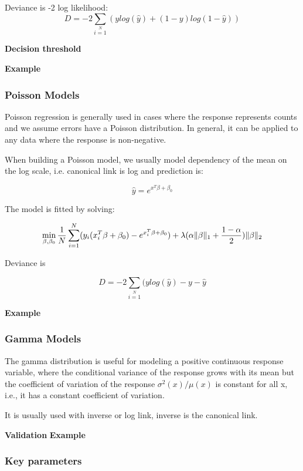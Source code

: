 \documentclass[11pt]{article}
\begin{document}
Deviance is -2 log likelihood:
\[D = -2\sum\limits_{i=1}\limits^{N}{(y log(\hat{y}) + (1 - y)log(1-\hat{y})  )}\]

\textbf{Decision threshold}

\textbf{Example}

\subsubsection{Poisson Models}
Poisson regression is generally used in cases where the response represents counts and we assume errors have a Poisson distribution. In general, it can be applied to any data where the response is non-negative. 

When building a Poisson model, we usually model dependency of the mean on the log scale, i.e. canonical link is log and prediction is:

\[\hat{y} = e^{x^T\beta + \beta_0}\]

The model is fitted by solving:

\[  \min\limits_{\beta,\beta_0} { {1 \over N}\sum\limits_{i=1}\limits^{N}(y_i (x_i^{T}\beta  + \beta_0) - e^{x_i^{T}\beta  + \beta_0})  + \lambda (\alpha \|\beta \|_1 + {1-\alpha \over 2}) \|\beta\|_2} \]

Deviance is 

\[D = -2\sum\limits_{i=1}\limits^{N}{(y log(\hat{y}) - y - \hat{y}}\]


\textbf{Example}

\subsubsection{Gamma Models}
The gamma distribution is useful for modeling a positive continuous response variable, where the conditional variance of the response grows with its mean but  the coefficient of variation of the response $\sigma^2(x)/μ(x)$ is constant for all x,  i.e., it has a constant coefficient of variation.

It is usually used with inverse or log link, inverse is the canonical link.



\textbf{Validation}
\textbf{Example}


\subsubsection{Key parameters}
\end{document}
